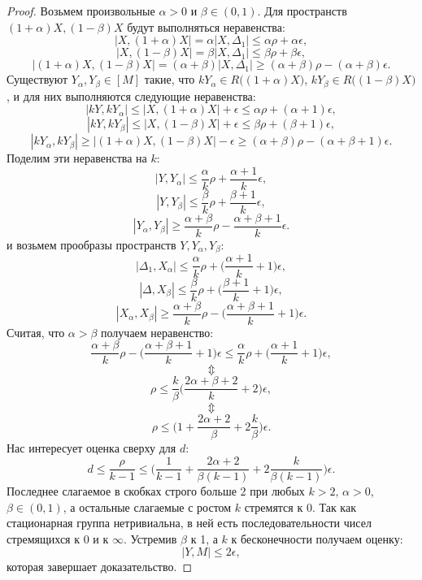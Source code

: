\documentclass[11pt,twoside,draft
]{article}
\begin{document}
\begin{proof}
	Возьмем произвольные $\alpha > 0$ и $\beta \in (0,1)$. Для пространств $(1+\alpha)X, (1-\beta)X$ будут выполняться неравенства:
	$$|X, (1+\alpha)X| = \alpha |X, \Delta_1| \le \alpha\rho + \alpha\epsilon,$$
	$$|X, (1-\beta)X| = \beta|X, \Delta_1| \le \beta\rho + \beta\epsilon,$$
	$$|(1+\alpha) X, (1-\beta)X| = (\alpha + \beta)|X, \Delta_1| \ge (\alpha+\beta)\rho - (\alpha+\beta)\epsilon.$$
	Существуют
	$Y_\alpha, Y_\beta \in [M]$ такие, что
	$kY_\alpha \in R\big((1+\alpha)X\big)$, $kY_\beta \in R\big((1-\beta)X\big)$, и
	для них выполняются следующие неравенства:
	$$|kY, kY_\alpha| \le |X, (1+\alpha)X| + \epsilon \le \alpha\rho + (\alpha+1)\epsilon,$$
	$$|kY, kY_\beta| \le |X, (1-\beta)X| + \epsilon \le \beta\rho + (\beta+1)\epsilon,$$
	$$|kY_\alpha, kY_\beta| \ge |(1+\alpha)X, (1-\beta)X| - \epsilon \ge  (\alpha+\beta)\rho - (\alpha+\beta+1)\epsilon.$$
	Поделим эти неравенства на $k$:
	$$|Y, Y_{\alpha}| \le \frac{\alpha}{k}\rho + \frac{\alpha+1}{k}\epsilon,$$
	$$|Y, Y_{\beta}| \le \frac{\beta}{k}\rho + \frac{\beta+1}{k}\epsilon,$$
	$$|Y_\alpha, Y_{\beta}| \ge \frac{\alpha+\beta}{k}\rho - \frac{\alpha+\beta+1}{k}\epsilon.$$
	и возьмем прообразы пространств $Y, Y_{\alpha}, Y_{\beta}$:
	$$|\Delta_1, X_{\alpha}| \le \frac{\alpha}{k}\rho + \big(\frac{\alpha+1}{k} + 1\big)\epsilon,$$
	$$|\Delta, X_{\beta}| \le \frac{\beta}{k}\rho + \big(\frac{\beta+1}{k}+1\big)\epsilon,$$
	$$|X_\alpha, X_{\beta}| \ge \frac{\alpha+\beta}{k}\rho - \big(\frac{\alpha+\beta+1}{k}+1\big)\epsilon.$$
	Считая, что $\alpha > \beta$ получаем неравенство:
	$$\frac{\alpha+\beta}{k}\rho - \big(\frac{\alpha+\beta+1}{k}+1\big)\epsilon \le \frac{\alpha}{k}\rho + \big(\frac{\alpha+1}{k} + 1\big)\epsilon,$$
	$$\Updownarrow$$
	$$\rho \le \frac{k}{\beta}\bigg(\frac{2\alpha+\beta+2}{k}+2\bigg)\epsilon,$$
	$$\Updownarrow$$
	$$\rho \le \bigg(1+\frac{2\alpha + 2}{\beta} + 2\frac{k}{\beta}\bigg)\epsilon.$$
	Нас интересует оценка сверху для $d$:
	$$d \le \frac{\rho}{k-1} \le \bigg(\frac{1}{k-1}+\frac{2\alpha + 2}{\beta(k-1)} + 2\frac{k}{\beta(k-1)}\bigg)\epsilon. $$
	Последнее слагаемое в скобках строго больше 2 при любых $k>2$, $\alpha>0$,
	$\beta\in (0,1)$, а остальные слагаемые с ростом $k$ стремятся к $0$. Так как стационарная группа нетривиальна, в ней есть последовательности чисел стремящихся к 0 и к $\infty$.
	Устремив $\beta$ к 1, а $k$ к бесконечности получаем оценку:
	$$|Y, M| \le 2\epsilon,$$
	которая завершает доказательство.
	
\end{proof}
\end{document}
